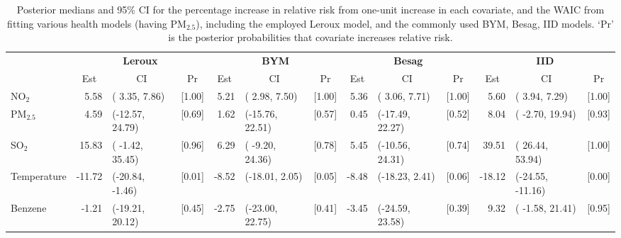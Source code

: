 \documentclass[12,]{article}
\begin{document}
\begin{landscape}\begin{table}

\caption{\label{tab:monitoringModel}Posterior medians and 95\% CI for the percentage increase in relative risk from one-unit increase in each covariate, and the WAIC from fitting various health models (having PM$_{2.5}$), including the employed Leroux model, and the commonly used BYM, Besag, IID models. `Pr' is the posterior probabilities that covariate increases relative risk.}
\centering
\fontsize{9}{11}\selectfont
\begin{tabular}[t]{lrlcrlcrlcrlc}
\toprule
\multicolumn{1}{c}{\textbf{ }} & \multicolumn{3}{c}{\textbf{Leroux}} & \multicolumn{3}{c}{\textbf{BYM}} & \multicolumn{3}{c}{\textbf{Besag}} & \multicolumn{3}{c}{\textbf{IID}} \\
\cmidrule(l{3pt}r{3pt}){2-4} \cmidrule(l{3pt}r{3pt}){5-7} \cmidrule(l{3pt}r{3pt}){8-10} \cmidrule(l{3pt}r{3pt}){11-13}
\multicolumn{1}{c}{ } & \multicolumn{1}{c}{Est} & \multicolumn{1}{c}{CI} & \multicolumn{1}{c}{Pr} & \multicolumn{1}{c}{Est} & \multicolumn{1}{c}{CI} & \multicolumn{1}{c}{Pr} & \multicolumn{1}{c}{Est} & \multicolumn{1}{c}{CI} & \multicolumn{1}{c}{Pr} & \multicolumn{1}{c}{Est} & \multicolumn{1}{c}{CI} & \multicolumn{1}{c}{Pr} \\
\cmidrule(l{3pt}r{3pt}){2-2} \cmidrule(l{3pt}r{3pt}){3-3} \cmidrule(l{3pt}r{3pt}){4-4} \cmidrule(l{3pt}r{3pt}){5-5} \cmidrule(l{3pt}r{3pt}){6-6} \cmidrule(l{3pt}r{3pt}){7-7} \cmidrule(l{3pt}r{3pt}){8-8} \cmidrule(l{3pt}r{3pt}){9-9} \cmidrule(l{3pt}r{3pt}){10-10} \cmidrule(l{3pt}r{3pt}){11-11} \cmidrule(l{3pt}r{3pt}){12-12} \cmidrule(l{3pt}r{3pt}){13-13}
NO$_2$ & 5.58 & (  3.35,   7.86) & [1.00] & 5.21 & (  2.98,   7.50) & [1.00] & 5.36 & (  3.06,   7.71) & [1.00] & 5.60 & (  3.94,   7.29) & [1.00]\\
PM$_{2.5}$ & 4.59 & (-12.57,  24.79) & [0.69] & 1.62 & (-15.76,  22.51) & [0.57] & 0.45 & (-17.49,  22.27) & [0.52] & 8.04 & ( -2.70,  19.94) & [0.93]\\
SO$_2$ & 15.83 & ( -1.42,  35.45) & [0.96] & 6.29 & ( -9.20,  24.36) & [0.78] & 5.45 & (-10.56,  24.31) & [0.74] & 39.51 & ( 26.44,  53.94) & [1.00]\\
Temperature & -11.72 & (-20.84,  -1.46) & [0.01] & -8.52 & (-18.01,   2.05) & [0.05] & -8.48 & (-18.23,   2.41) & [0.06] & -18.12 & (-24.55, -11.16) & [0.00]\\
Benzene & -1.21 & (-19.21,  20.12) & [0.45] & -2.75 & (-23.00,  22.75) & [0.41] & -3.45 & (-24.59,  23.58) & [0.39] & 9.32 & ( -1.58,  21.41) & [0.95]\\

\end{tabular}
\end{table}
\end{landscape}
\end{document}
